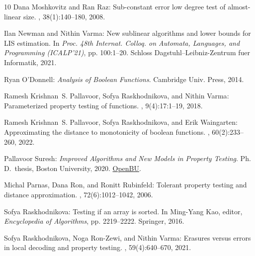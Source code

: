 \documentclass[11pt]{article}
\numberwithin{equation}{section}
\theoremstyle{definition}
\theoremstyle{plain}
\begin{document}
\begin{thebibliography}{10}
{\sc Dana Moshkovitz and Ran Raz}: Sub-constant error low degree test of
  almost-linear size.
, 38(1):140--180, 2008.
\newblock [\epfmtdoi{10.1137/060656838}]

{\sc Ilan Newman and Nithin Varma}: New sublinear algorithms and lower bounds
  for {LIS} estimation.
\newblock In {\em Proc. 48th Internat. Colloq. on Automata, Languages, and
  Programming (ICALP'21)}, pp. 100:1--20. Schloss Dagstuhl--Leibniz-Zentrum
  fuer Informatik, 2021.

{\sc Ryan O'Donnell}: {\em Analysis of Boolean Functions}.
\newblock Cambridge Univ. Press, 2014.

{\sc Ramesh Krishnan~S. Pallavoor, Sofya Raskhodnikova, and Nithin Varma}:
  Parameterized property testing of functions.
, 9(4):17:1--19, 2018.
\newblock [\epfmtdoi{10.1145/3155296}]

{\sc Ramesh Krishnan~S. Pallavoor, Sofya Raskhodnikova, and Erik Waingarten}:
  Approximating the distance to monotonicity of boolean functions.
, 60(2):233--260, 2022.

{ {Pallavoor Suresh}}: {\em Improved Algorithms and New
  Models in Property Testing}.
\newblock Ph.\,D.\ thesis, Boston University, 2020.
\newblock \href{https://hdl.handle.net/2144/42025}{OpenBU}.

{\sc Michal Parnas, Dana Ron, and Ronitt Rubinfeld}: Tolerant property testing
  and distance approximation.
, 72(6):1012--1042, 2006.

{\sc Sofya Raskhodnikova}: Testing if an array is sorted.
\newblock In {\sc Ming-Yang Kao}, editor, {\em Encyclopedia of Algorithms}, pp.
  2219--2222. Springer, 2016.
\newblock [\epfmtdoi{10.1007/978-1-4939-2864-4\_700}]

{\sc Sofya Raskhodnikova, Noga Ron{-}Zewi, and Nithin Varma}: Erasures versus
  errors in local decoding and property testing.
, 59(4):640--670, 2021.


\end{thebibliography}
\end{document}
